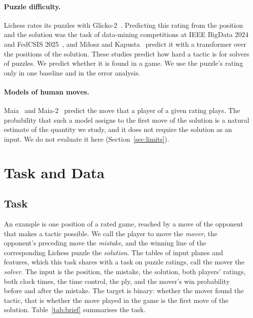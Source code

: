 \documentclass[11pt]{article}
\begin{document}
\paragraph{Puzzle difficulty.}
Lichess rates its puzzles with Glicko-2~\cite{glicko2}. Predicting this
rating from the position and the solution was the task of data-mining
competitions at IEEE BigData 2024 and FedCSIS
2025~\cite{puzzlecup,puzzlecupwinner}, and Mi{\l}osz and
Kapusta~\cite{glickformer} predict it with a transformer over the positions
of the solution. These studies predict how hard a tactic is for solvers of
puzzles. We predict whether it is found in a game. We use the puzzle's rating
only in one baseline and in the error analysis.

\paragraph{Models of human moves.}
Maia~\cite{maia} and Maia-2~\cite{maia2} predict the move that a player of a
given rating plays. The probability that such a model assigns to the first
move of the solution is a natural estimate of the quantity we study, and it
does not require the solution as an input. We do not evaluate it here
(Section~\ref{sec:limits}).

\section{Task and Data}
\label{sec:data}

\subsection{Task}

An example is one position of a rated game, reached by a move of the
opponent that makes a tactic possible. We call the player to move the
\emph{mover}, the opponent's preceding move the \emph{mistake}, and the
winning line of the corresponding Lichess puzzle the \emph{solution}. The
tables of input planes and features, which this task shares with a task on
puzzle ratings, call the mover the \emph{solver}. The input is the position,
the mistake, the solution, both players' ratings, both clock times, the time
control, the ply, and the mover's win probability before and after the
mistake. The target is binary: whether the mover found the tactic, that is
whether the move played in the game is the first move of the solution.
Table~\ref{tab:brief} summarises the task.
\end{document}
